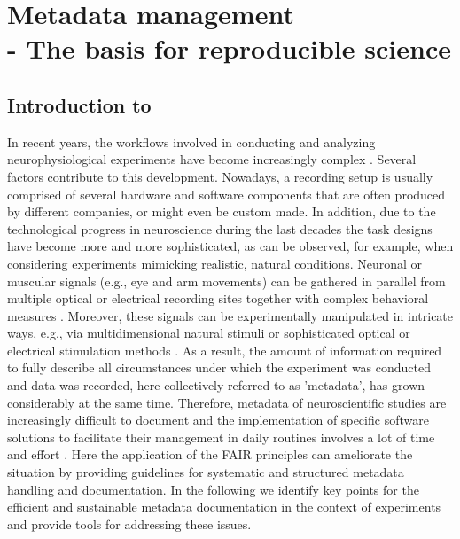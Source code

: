 \clearpage
\chapter[Metadata management]{Metadata management\\- The basis for reproducible science}
\label{sec:metadata}

\section{Introduction to }
\label{sec:Introduction}

In recent years, the workflows involved in conducting and analyzing neurophysiological experiments have become increasingly complex \citep[e.g.][]{Coles_2008, Denker_2016, Brochier_2018}. Several factors contribute to this development. Nowadays, a recording setup is usually comprised of several hardware and software components that are often produced by different companies, or might even be custom made. In addition, due to the technological progress in neuroscience during the last decades the task designs have become more and more sophisticated, as can be observed, for example, when considering experiments mimicking realistic, natural conditions. Neuronal or muscular signals (e.g., eye and arm movements) can be gathered in parallel from multiple optical or electrical recording sites \citep{Nicolelis_2002,Verkhratsky_2006,Obien_2014} together with complex behavioral measures \citep{Jacob_2010,Maldonado_2008,Vargas-Irwin_2010,Schwarz_2014}. Moreover, these signals can be experimentally manipulated in intricate ways, e.g., via multidimensional natural stimuli \citep{Geisler_2008} or sophisticated optical or electrical stimulation methods \citep{Deisseroth_2013,Miyamoto_2015}. As a result, the amount of information required to fully describe all circumstances under which the experiment was conducted and data was recorded, here collectively referred to as 'metadata', has grown considerably at the same time. Therefore, metadata of neuroscientific studies are increasingly difficult to document and the implementation of specific software solutions to facilitate their management in daily routines involves a lot of time and effort \citep{Zehl_2016}. Here the application of the FAIR principles can ameliorate the situation by providing guidelines for systematic and structured metadata handling and documentation. In the following we identify key points for the efficient and sustainable metadata documentation in the context of experiments and provide tools for addressing these issues.

